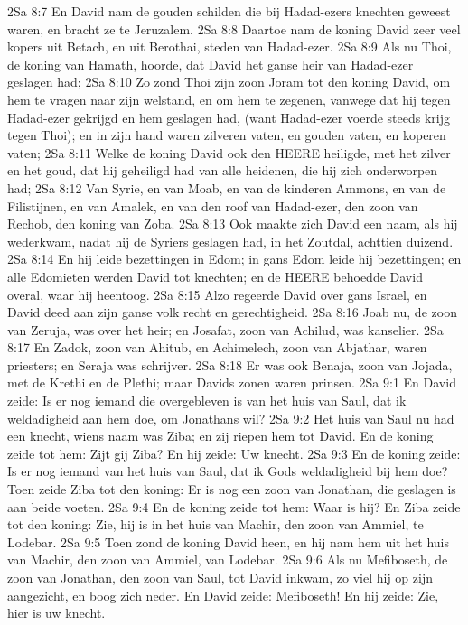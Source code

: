 2Sa 8:7  En David nam de gouden schilden die bij Hadad-ezers knechten geweest waren, en bracht ze te Jeruzalem.
2Sa 8:8  Daartoe nam de koning David zeer veel kopers uit Betach, en uit Berothai, steden van Hadad-ezer.
2Sa 8:9  Als nu Thoi, de koning van Hamath, hoorde, dat David het ganse heir van Hadad-ezer geslagen had;
2Sa 8:10  Zo zond Thoi zijn zoon Joram tot den koning David, om hem te vragen naar zijn welstand, en om hem te zegenen, vanwege dat hij tegen Hadad-ezer gekrijgd en hem geslagen had, (want Hadad-ezer voerde steeds krijg tegen Thoi); en in zijn hand waren zilveren vaten, en gouden vaten, en koperen vaten;
2Sa 8:11  Welke de koning David ook den HEERE heiligde, met het zilver en het goud, dat hij geheiligd had van alle heidenen, die hij zich onderworpen had;
2Sa 8:12  Van Syrie, en van Moab, en van de kinderen Ammons, en van de Filistijnen, en van Amalek, en van den roof van Hadad-ezer, den zoon van Rechob, den koning van Zoba.
2Sa 8:13  Ook maakte zich David een naam, als hij wederkwam, nadat hij de Syriers geslagen had, in het Zoutdal, achttien duizend.
2Sa 8:14  En hij leide bezettingen in Edom; in gans Edom leide hij bezettingen; en alle Edomieten werden David tot knechten; en de HEERE behoedde David overal, waar hij heentoog.
2Sa 8:15  Alzo regeerde David over gans Israel, en David deed aan zijn ganse volk recht en gerechtigheid.
2Sa 8:16  Joab nu, de zoon van Zeruja, was over het heir; en Josafat, zoon van Achilud, was kanselier.
2Sa 8:17  En Zadok, zoon van Ahitub, en Achimelech, zoon van Abjathar, waren priesters; en Seraja was schrijver.
2Sa 8:18  Er was ook Benaja, zoon van Jojada, met de Krethi en de Plethi; maar Davids zonen waren prinsen.
2Sa 9:1  En David zeide: Is er nog iemand die overgebleven is van het huis van Saul, dat ik weldadigheid aan hem doe, om Jonathans wil?
2Sa 9:2  Het huis van Saul nu had een knecht, wiens naam was Ziba; en zij riepen hem tot David. En de koning zeide tot hem: Zijt gij Ziba? En hij zeide: Uw knecht.
2Sa 9:3  En de koning zeide: Is er nog iemand van het huis van Saul, dat ik Gods weldadigheid bij hem doe? Toen zeide Ziba tot den koning: Er is nog een zoon van Jonathan, die geslagen is aan beide voeten.
2Sa 9:4  En de koning zeide tot hem: Waar is hij? En Ziba zeide tot den koning: Zie, hij is in het huis van Machir, den zoon van Ammiel, te Lodebar.
2Sa 9:5  Toen zond de koning David heen, en hij nam hem uit het huis van Machir, den zoon van Ammiel, van Lodebar.
2Sa 9:6  Als nu Mefiboseth, de zoon van Jonathan, den zoon van Saul, tot David inkwam, zo viel hij op zijn aangezicht, en boog zich neder. En David zeide: Mefiboseth! En hij zeide: Zie, hier is uw knecht.
